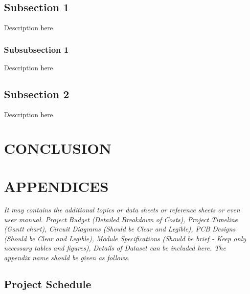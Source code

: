 \documentclass{ioereport}
\begin{document}
    \subsection{Subsection 1}
        Description here
        \subsubsection{Subsubsection 1}
            Description here
    \subsection{Subsection 2}
        Description here

    \pagebreak

\section{\MakeUppercase{Conclusion}}
    \lipsum[2]

    \pagebreak
    
\AppendixStyle{5.5em} %
\section{\MakeUppercase{Appendices}} \label{sec:appendices}
    \textit{It may contains the additional topics or data sheets or reference sheets or even user manual. Project Budget (Detailed Breakdown of Costs), Project Timeline (Gantt chart), Circuit Diagrams (Should be Clear and Legible), PCB Designs (Should be Clear and Legible), Module Specifications (Should be brief - Keep only necessary tables and figures), Details of Dataset can be included here. The appendix name should be given as follows.}
    
    \setcounter{subsection}{0}
    \subsection{Project Schedule}
    
\end{document}
